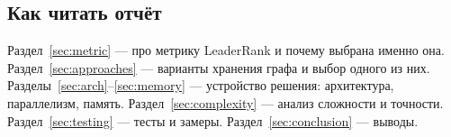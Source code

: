 \subsection{Как читать отчёт}
Раздел~\ref{sec:metric} --- про метрику LeaderRank и почему выбрана именно она.
Раздел~\ref{sec:approaches} --- варианты хранения графа и выбор одного из них.
Разделы~\ref{sec:arch}--\ref{sec:memory} --- устройство решения: архитектура, параллелизм, память.
Раздел~\ref{sec:complexity} --- анализ сложности и точности.
Раздел~\ref{sec:testing} --- тесты и замеры.
Раздел~\ref{sec:conclusion} --- выводы.
